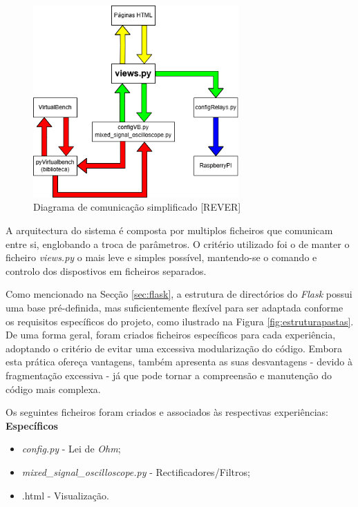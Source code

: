 \begin{figure}[hbtp]
	\centering
	\includegraphics[width=0.7\textwidth]{figures/Diagrama_simplificado.drawio.png}
	\caption{Diagrama de comunicação simplificado [REVER]}
	\label{fig:diagramasimplificado}
\end{figure}

A arquitectura do sistema é composta por multiplos ficheiros que comunicam entre si, englobando a troca de parâmetros. O critério utilizado foi o de manter o ficheiro \textit{views.py} o mais leve e simples possível, mantendo-se o comando e controlo dos dispostivos em ficheiros separados.

Como mencionado na Secção \ref{sec:flask}, a estrutura de directórios do \textit{Flask} possui uma base pré-definida, mas suficientemente flexível para ser adaptada conforme os requisitos específicos do projeto, como ilustrado na Figura \ref{fig:estruturapastas}. De uma forma geral, foram criados ficheiros específicos para cada experiência, adoptando o critério de evitar uma excessiva modularização do código. Embora esta prática ofereça vantagens, também apresenta as suas desvantagens - devido à fragmentação excessiva - já que pode tornar a compreensão e manutenção do código mais complexa.

Os seguintes ficheiros foram criados e associados às respectivas experiências:
\\[1em]
\textbf{Específicos}
\begin{itemize}
	\item \textit{config.py} - Lei de \textit{Ohm};
	\item \textit{mixed\_signal\_oscilloscope.py} - Rectificadores/Filtros;
	\item {}.html - Visualização.
\end{itemize}


